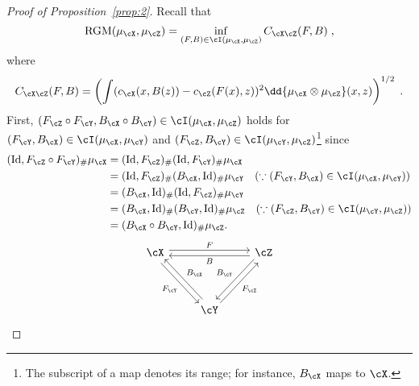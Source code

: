 \documentclass[11pt]{article}
\begin{document}
\begin{proof}[Proof of Proposition~\ref{prop:2}]
	Recall that
	\begin{equation*}
		\mathrm{RGM}(\mu_{\cX}, \mu_{\cZ}) = \inf_{(F, B) \in \cI(\mu_{\cX}, \mu_{\cZ})} C_{\cX \cZ}(F, B)\;,
		\end{equation*}
	where
	\begin{equation*}
		C_{\cX \cZ}(F, B)
		= \left(\int (c_{\cX}(x, B(z)) - c_{\cZ}(F(x), z))^2 \dd{\mu_{\cX} \otimes \mu_{\cZ}}(x, z)\right)^{1/2}\;.
	\end{equation*}
	First, $(F_{\cZ} \circ F_{\cY}, B_{\cX} \circ B_{\cY}) \in \cI(\mu_{\cX}, \mu_{\cZ})$ holds for $(F_{\cY}, B_{\cX}) \in \cI(\mu_{\cX}, \mu_{\cY})$ and $(F_{\cZ}, B_{\cY}) \in \cI(\mu_{\cY}, \mu_{\cZ})$\footnote{The subscript of a map denotes its range; for instance, $B_{\cX}$ maps to $\cX$.} since
	\begin{equation*}
		\begin{split}
			(\mathrm{Id}, F_{\cZ} \circ F_{\cY})_{\#}\mu_{\cX} &= (\mathrm{Id}, F_{\cZ})_{\#} (\mathrm{Id}, F_{\cY})_{\#} \mu_{\cX} \\
			&= (\mathrm{Id}, F_{\cZ})_{\#} (B_{\cX}, \mathrm{Id})_{\#} \mu_{\cY} \quad (\because (F_{\cY}, B_{\cX}) \in \cI(\mu_{\cX}, \mu_{\cY}))\\
			&= (B_{\cX}, \mathrm{Id})_{\#} (\mathrm{Id}, F_{\cZ})_{\#} \mu_{\cY} \\
			& = (B_{\cX}, \mathrm{Id})_{\#} (B_{\cY}, \mathrm{Id})_{\#} \mu_{\cZ} \quad (\because (F_{\cZ}, B_{\cY}) \in \cI(\mu_{\cY}, \mu_{\cZ})) \\
			& = (B_{\cX} \circ B_{\cY}, \mathrm{Id})_{\#} \mu_{\cZ}.
		\end{split}
	\end{equation*}
	\begin{equation*}
		\begin{tikzcd}[row sep = huge]
			\cX \arrow[rr, "F", shift left] \arrow[dr, "F_{\cY}", swap, shift right]
			&&
			\cZ	\arrow[ll, "B", shift left] \arrow[dl, "B_{\cY}", swap, shift right]\\
			&
			\cY \arrow[ur, "F_{\cZ}", swap, shift right] \arrow[ul, "B_{\cX}", swap, shift right]
		\end{tikzcd}
	\end{equation*}



\end{proof}
\end{document}
